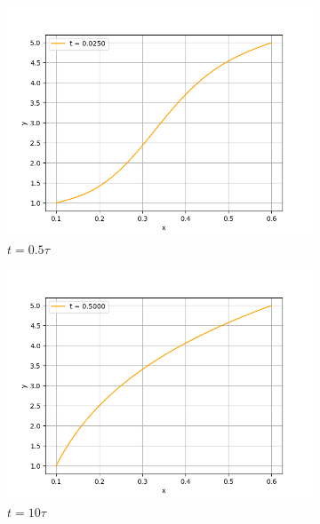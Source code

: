 \documentclass[12pt]{article}%
\begin{document}
\begin{figure}[H]
\centering
\begin{subfigure}{0.32\textwidth}
    \includegraphics[width=\textwidth]{implicit-phi2-time-0.0250.png}
    \caption{$t = 0.5 \tau$}
\end{subfigure}
\hfill
\begin{subfigure}{0.32\textwidth}
    \includegraphics[width=\textwidth]{implicit-phi2-time-0.5000.png}
    \caption{$t = 10 \tau$}
\end{subfigure}
\hfill
\begin{subfigure}{0.32\textwidth}

\end{subfigure}
\end{figure}
\end{document}

